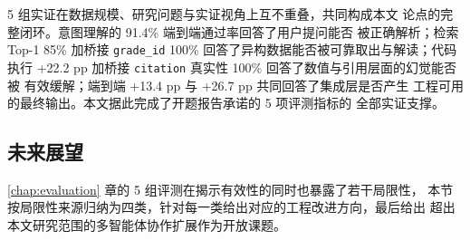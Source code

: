 \documentclass[a4paper]{article}
\theoremstyle{definition}
\theoremstyle{plain}
\theoremstyle{remark}
\let\oldcite\cite
\renewcommand{\cite}[1]{\textsuperscript{\oldcite{#1}}}
\newcommand{\bk}{\discretionary{}{}{}}
\begin{document}
5 组实证在数据规模、研究问题与实证视角上互不重叠，共同构成本文
论点的完整闭环。意图理解的 91.4\% 端到端通过率回答了用户提问能否
被正确解析；检索 Top-1 85\% 加桥接 \texttt{grade\_\bk{}id} 100\%
回答了异构数据能否被可靠取出与解读；代码执行 +22.2 pp 加桥接
\texttt{citation} 真实性 100\% 回答了数值与引用层面的幻觉能否被
有效缓解；端到端 +13.4 pp 与 +26.7 pp 共同回答了集成层是否产生
工程可用的最终输出。本文据此完成了开题报告承诺的 5 项评测指标的
全部实证支撑。



\subsection{未来展望}
\label{sec:future-work}

\ref{chap:evaluation} 章的 5 组评测在揭示有效性的同时也暴露了若干局限性，
本节按局限性来源归纳为四类，针对每一类给出对应的工程改进方向，最后给出
超出本文研究范围的多智能体协作扩展作为开放课题。
\end{document}
